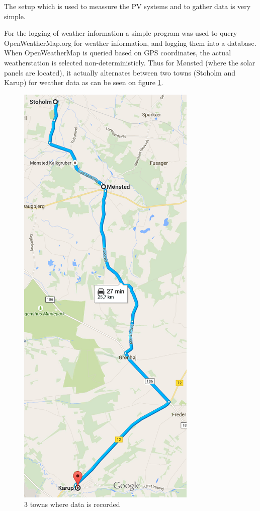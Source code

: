 The setup which is used to meassure the PV systems and to gather data
is very simple.

For the logging of weather information a simple program was used to
query OpenWeatherMap.org for weather information, and logging them
into a database.  When OpenWeatherMap is queried based on GPS
coordinates, the actual weatherstation is selected
non-deterministicly.  Thus for Mønsted (where the solar panels are
located), it actually alternates between two towns (Stoholm and Karup)
for weather data as can be seen on figure \ref{fig:mapsPicture}.

\begin{figure}[h]
  \centering
  \includegraphics{mapsPicture}
  \caption{3 towns where data is recorded}
  \label{fig:mapsPicture}
\end{figure}

